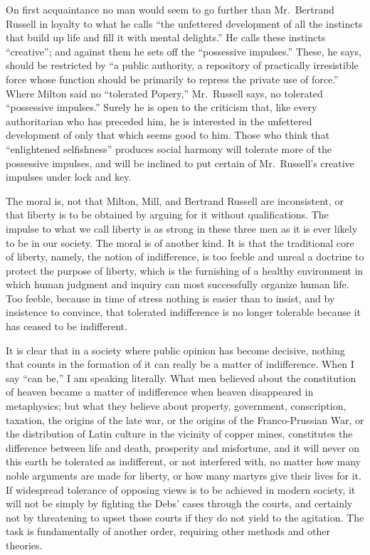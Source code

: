 \documentclass[openany,nobib,nohyper]{tufte-book}
\begin{document}
On first acquaintance no man would seem to go further than Mr.~Bertrand
Russell in loyalty to what he calls ``the unfettered development of all
the instincts that build up life and fill it with mental delights.'' He
calls these instincts ``creative''; and against them he sets off the
``possessive impulses.'' These, he says, should be restricted by ``a
public authority, a repository of practically irresistible force whose
function should be primarily to repress the private use of force.''
Where Milton said no ``tolerated Popery,'' Mr.~Russell says, no
tolerated ``possessive impulses.'' Surely he is open to the criticism
that, like every authoritarian who has preceded him, he is interested in
the unfettered development of only that which seems good to him. Those
who think that ``enlightened selfishness'' produces social harmony will
tolerate more of the possessive impulses, and will be inclined to put
certain of Mr.~Russell's creative impulses under lock and key.

The moral is, not that Milton, Mill, and Bertrand Russell are
inconsistent, or that liberty is to be obtained by arguing for it
without qualifications. The impulse to what we call liberty is as strong
in these three men as it is ever likely to be in our society. The moral
is of another kind. It is that the traditional core of liberty, namely,
the notion of indifference, is too feeble and unreal a doctrine to
protect the purpose of liberty, which is the furnishing of a healthy
environment in which human judgment and inquiry can most successfully
organize human life. Too feeble, because in time of stress nothing is
easier than to insist, and by insistence to convince, that tolerated
indifference is no longer tolerable because it has ceased to be
indifferent.

It is clear that in a society where public opinion has become decisive,
nothing that counts in the formation of it can really be a matter of
indifference. When I say ``can be,'' I am speaking literally. What men
believed about the constitution of heaven became a matter of
indifference when heaven disappeared in metaphysics; but what they
believe about property, government, conscription, taxation, the origins
of the late war, or the origins of the Franco-Prussian War, or the
distribution of Latin culture in the vicinity of copper mines,
constitutes the difference between life and death, prosperity and
misfortune, and it will never on this earth be tolerated as indifferent,
or not interfered with, no matter how many noble arguments are made for
liberty, or how many martyrs give their lives for it. If widespread
tolerance of opposing views is to be achieved in modern society, it will
not be simply by fighting the Debs' cases through the courts, and
certainly not by threatening to upset those courts if they do not yield
to the agitation. The task is fundamentally of another order, requiring
other methods and other theories.
\end{document}
